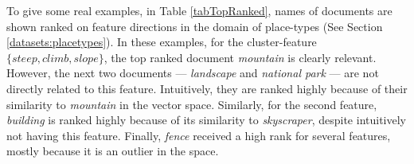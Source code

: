 To give some real examples, in Table \ref{tabTopRanked}, names of documents are shown ranked on feature directions in the domain of place-types (See Section \ref{datasets:placetypes}). In these examples, for the cluster-feature $\{\textit{steep},\textit{climb},\textit{slope}\}$, the top ranked document \textit{mountain} is clearly relevant. However, the next two documents --- \textit{landscape} and \textit{national park} --- are not directly related to this feature. Intuitively, they are ranked highly because of their similarity to \textit{mountain} in the vector space. Similarly, for the second feature, \textit{building} is ranked highly because of its similarity to \textit{skyscraper}, despite intuitively not having this feature. Finally, \textit{fence} received a high rank for several features,  mostly because it is an outlier in the space. 


